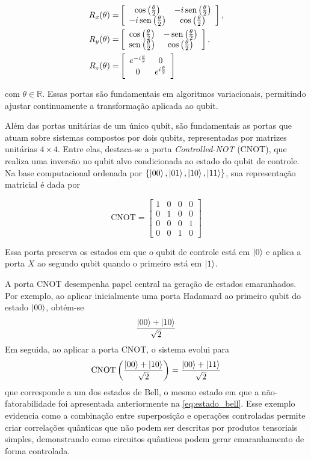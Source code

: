 \begin{align}
    R_x(\theta)= &
    \left[\begin{array}{cc}
        \cos\left(\frac{\theta}{2}\right) & -i\operatorname{sen}\left(\frac{\theta}{2}
        \right)\\
        -i\operatorname{sen}\left(\frac{\theta}{2}\right) & \cos\left(\frac{\theta}{2}
        \right)
    \end{array}\right], \\
    R_y(\theta)= &
    \left[\begin{array}{cc}
        \cos\left(\frac{\theta}{2}\right) & -\operatorname{sen}\left(\frac{\theta}{2}
        \right)\\
        \operatorname{sen}\left(\frac{\theta}{2}\right) & \cos\left(\frac{\theta}{2}
        \right)
    \end{array}\right], \\
    R_z(\theta)= &
    \left[\begin{array}{cc}
        e^{-i\frac{\theta}{2}} & 0\\
        0 & e^{i\frac{\theta}{2}}
    \end{array} \right]
\end{align}

\noindent com $\theta\in\mathbb{R}$. Essas portas são fundamentais em algoritmos variacionais, permitindo ajustar continuamente a transformação aplicada ao qubit.

Além das portas unitárias de um único qubit, são fundamentais as portas que atuam sobre sistemas compostos por dois qubits, representadas por matrizes unitárias $4\times4$. Entre elas, destaca-se a porta \textit{Controlled-NOT} (CNOT), que realiza uma inversão no qubit alvo condicionada ao estado do qubit de controle. Na base computacional ordenada por $\{\ket{00},\ket{01},\ket{10},\ket{11}\}$, sua representação matricial é dada por

$$
    \mathrm{CNOT}= \left[
    \begin{array}{cccc}
        1 & 0 & 0 & 0\\
        0 & 1 & 0 & 0\\
        0 & 0 & 0 & 1\\
        0 & 0 & 1 & 0
    \end{array} \right]
$$

Essa porta preserva os estados em que o qubit de controle está em $\ket{0}$ e aplica a porta $X$ ao segundo qubit quando o primeiro está em $\ket{1}$.

A porta CNOT desempenha papel central na geração de estados emaranhados. Por exemplo, ao aplicar inicialmente uma porta Hadamard ao primeiro qubit do estado $\ket{00}$, obtém-se
$$
\frac{\ket{00}+\ket{10}}{\sqrt{2}}
$$
Em seguida, ao aplicar a porta CNOT, o sistema evolui para
$$
\mathrm{CNOT}\left(\frac{\ket{00}+\ket{10}}{\sqrt{2}}\right)
=
\frac{\ket{00}+\ket{11}}{\sqrt{2}}
$$
que corresponde a um dos estados de Bell, o mesmo estado em que a não-fatorabilidade foi apresentada anteriormente na \autoref{eq:estado_bell}. Esse exemplo evidencia como a combinação entre superposição e operações controladas permite criar correlações quânticas que não podem ser descritas por produtos tensoriais simples, demonstrando como circuitos quânticos podem gerar emaranhamento de forma controlada.

